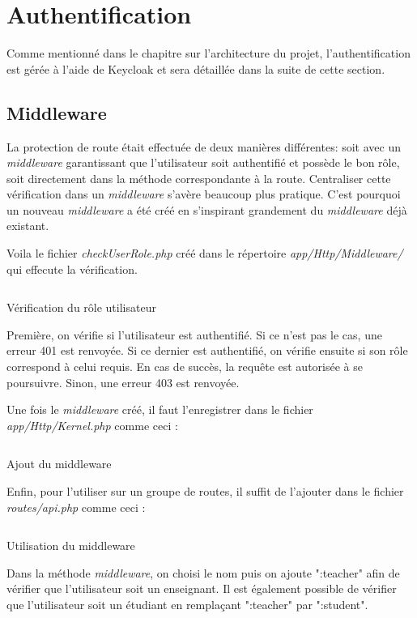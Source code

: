\section{Authentification}
Comme mentionné dans le chapitre sur l'architecture du projet, l'authentification est gérée à l'aide de Keycloak et sera détaillée dans la suite de cette section.

\subsection{Middleware}
La protection de route était effectuée de deux manières différentes: soit avec un \emph{middleware} garantissant que l'utilisateur soit authentifié et possède le bon rôle, soit directement dans la méthode correspondante à la route. Centraliser cette vérification dans un \emph{middleware} s'avère beaucoup plus pratique. C'est pourquoi un nouveau \emph{middleware} a été créé en s'inspirant grandement du \emph{middleware} déjà existant.

Voila le fichier \emph{checkUserRole.php} créé dans le répertoire \emph{app/Http/Middleware/} qui effecute la vérification.

\begin{listing}[H]
    \inputminted{php}{assets/code/checkUserRole.php}
    \caption{Vérification du rôle utilisateur}
\end{listing}

Première, on vérifie si l'utilisateur est authentifié. Si ce n'est pas le cas, une erreur 401 est renvoyée. Si ce dernier est authentifié, on vérifie ensuite si son rôle correspond à celui requis. En cas de succès, la requête est autorisée à se poursuivre. Sinon, une erreur 403 est renvoyée.

Une fois le \emph{middleware} créé, il faut l'enregistrer dans le fichier \emph{app/Http/Kernel.php} comme ceci :

\begin{listing}[H]
    \inputminted{php}{assets/code/addMiddleware.php}
    \caption{Ajout du middleware}
\end{listing}

Enfin, pour l'utiliser sur un groupe de routes, il suffit de l'ajouter dans le fichier \emph{routes/api.php} comme ceci :
\begin{listing}[H]
    \inputminted{php}{assets/code/middlewareRoutes.php}
    \caption{Utilisation du middleware}
\end{listing}

Dans la méthode \emph{middleware}, on choisi le nom puis on ajoute ":teacher" afin de vérifier que l'utilisateur soit un enseignant. Il est également possible de vérifier que l'utilisateur soit un étudiant en remplaçant ":teacher" par ":student".

